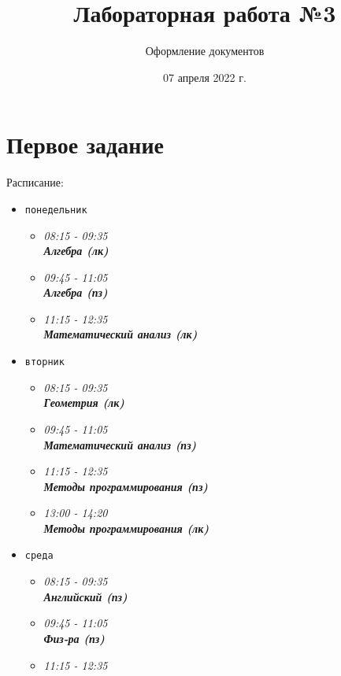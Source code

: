 \documentclass[a4paper,11pt]{article} %
\author{Оформление документов}
\title{Лабораторная работа №3}
\date{07 апреля 2022 г.}
\begin{document}
	
	\maketitle %
	
	\section{Первое задание}
	\qquad Расписание:
	\begin{itemize}
		\item {
			\texttt{понедельник}
			\begin{itemize}
				\item[\checkmark]{\it 08:15 - 09:35 \\
					\bf Алгебра (лк)}
				\item[\checkmark]{\it 09:45 - 11:05 \\
					\bf Алгебра (пз)}
				\item[\checkmark]{\it 11:15 - 12:35 \\
					\bf Математический анализ (лк)}
			\end{itemize}	
		}
		\item {
			\texttt{вторник}
			\begin{itemize}
				\item[\checkmark]{\it 08:15 - 09:35 \\
					\bf Геометрия (лк)}
				\item[\checkmark]{\it 09:45 - 11:05 \\
					\bf Математический анализ (пз)}
				\item[\checkmark]{\it 11:15 - 12:35 \\
					\bf Методы программирования (пз)}
				\item[\checkmark]{\it 13:00 - 14:20 \\
					\bf Методы программирования (лк)} 
			\end{itemize}	
		}
		\item {
			\texttt{среда}
			\begin{itemize}
				\item[\checkmark]{\it 08:15 - 09:35 \\
					\bf Английский (пз)}
				\item[\checkmark]{\it 09:45 - 11:05 \\
					\bf Физ-ра (пз)}
				\item[\checkmark]{\it 11:15 - 12:35 \\
}
\end{itemize}}
\end{itemize}
\end{document}
